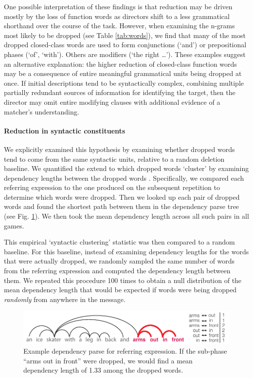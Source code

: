 \documentclass[alpha-refs]{wiley-article}
\begin{document}
One possible interpretation of these findings is that reduction may be driven mostly by the loss of function words as directors shift to a less grammatical shorthand over the course of the task.
However, when examining the n-grams most likely to be dropped (see Table \ref{tab:words}), we find that many of the most dropped closed-class words are used to form conjunctions (`and') or prepositional phases (`of', `with').
Others are modifiers (`the right \dots'). 
These examples suggest an alternative explanation: the higher reduction of closed-class function words may be a consequence of entire meaningful grammatical units being dropped at once.
If initial descriptions tend to be syntactically complex, combining multiple partially redundant sources of information for identifying the target, then the director may omit entire modifying clauses with additional evidence of a matcher's understanding.

\paragraph{Reduction in syntactic constituents} 
We explicitly examined this hypothesis by examining whether dropped words tend to come from the same syntactic units, relative to a random deletion baseline.
We quantified the extend to which dropped words `cluster' by examining dependency lengths between the dropped words \citep{jurafsky2014speech,futrell2015large}.
Specifically, we compared each referring expression to the one produced on the subsequent repetition to determine which words were dropped.
Then we looked up each pair of dropped words and found the shortest path between them in the dependency parse tree (see Fig. \ref{fig:dependency}).
We then took the mean dependency length across all such pairs in all games.

This empirical `syntactic clustering' statistic was then compared to a random baseline.
For this baseline, instead of examining dependency lengths for the words that were actually dropped, we randomly sampled the same number of words from the referring expression and computed the dependency length between them.
We repeated this procedure 100 times to obtain a null distribution of the mean dependency length that would be expected if words were being dropped \emph{randomly} from anywhere in the message.

\begin{figure}[t!]
\centering
\includegraphics[scale=.8]{dependency.pdf}
\caption{Example dependency parse for referring expression. If the sub-phase ``arms out in front'' were dropped, we would find a mean dependency length of 1.33 among the dropped words.} 
\label{fig:dependency}
\end{figure}
\end{document}
